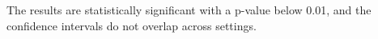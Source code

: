 The results are statistically significant with a p-value below 0.01, and the confidence intervals do not overlap across settings.
